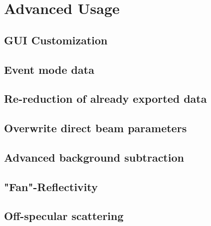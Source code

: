 \chapter{Advanced Usage}
\label{chap:advanced_usage}
  \section{GUI Customization}
  
  \section{Event mode data}
  
  \section{Re-reduction of already exported data}

  \section{Overwrite direct beam parameters}
  
  \section{Advanced background subtraction}
  
  \section{"Fan"-Reflectivity}
  
  \section{Off-specular scattering}
  
  